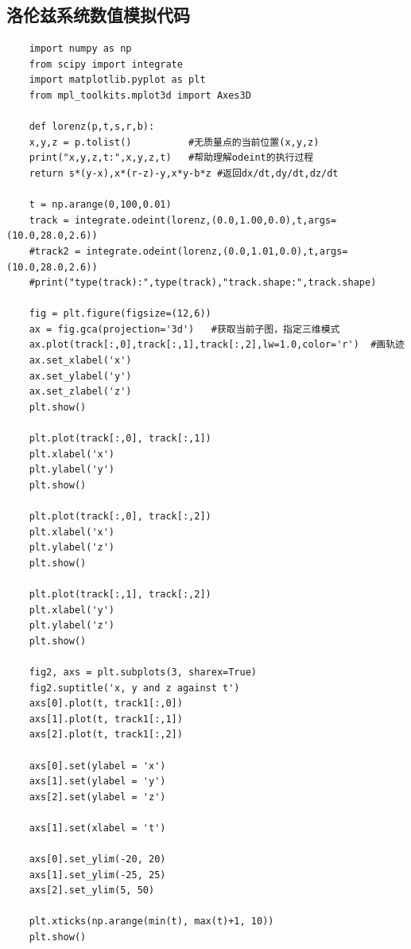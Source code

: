 \documentclass[10pt,a4paper,twoside,UTF8]{ctexart}
\begin{document}
\subsection*{洛伦兹系统数值模拟代码}
\begin{lstlisting}
	import numpy as np
	from scipy import integrate
	import matplotlib.pyplot as plt
	from mpl_toolkits.mplot3d import Axes3D

	def lorenz(p,t,s,r,b):
	x,y,z = p.tolist()          #无质量点的当前位置(x,y,z)
	print("x,y,z,t:",x,y,z,t)   #帮助理解odeint的执行过程
	return s*(y-x),x*(r-z)-y,x*y-b*z #返回dx/dt,dy/dt,dz/dt

	t = np.arange(0,100,0.01)
	track = integrate.odeint(lorenz,(0.0,1.00,0.0),t,args=(10.0,28.0,2.6))
	#track2 = integrate.odeint(lorenz,(0.0,1.01,0.0),t,args=(10.0,28.0,2.6))
	#print("type(track):",type(track),"track.shape:",track.shape)

	fig = plt.figure(figsize=(12,6))
	ax = fig.gca(projection='3d')   #获取当前子图，指定三维模式
	ax.plot(track[:,0],track[:,1],track[:,2],lw=1.0,color='r')	#画轨迹			
	ax.set_xlabel('x')
	ax.set_ylabel('y')
	ax.set_zlabel('z')
	plt.show()

	plt.plot(track[:,0], track[:,1])
	plt.xlabel('x')
	plt.ylabel('y')
	plt.show()

	plt.plot(track[:,0], track[:,2])
	plt.xlabel('x')
	plt.ylabel('z')
	plt.show()

	plt.plot(track[:,1], track[:,2])
	plt.xlabel('y')
	plt.ylabel('z')
	plt.show()

	fig2, axs = plt.subplots(3, sharex=True)
	fig2.suptitle('x, y and z against t')
	axs[0].plot(t, track1[:,0])
	axs[1].plot(t, track1[:,1])
	axs[2].plot(t, track1[:,2])

	axs[0].set(ylabel = 'x')
	axs[1].set(ylabel = 'y')
	axs[2].set(ylabel = 'z')

	axs[1].set(xlabel = 't')

	axs[0].set_ylim(-20, 20)
	axs[1].set_ylim(-25, 25)
	axs[2].set_ylim(5, 50)

	plt.xticks(np.arange(min(t), max(t)+1, 10))
	plt.show()
\end{lstlisting}
\end{document}
